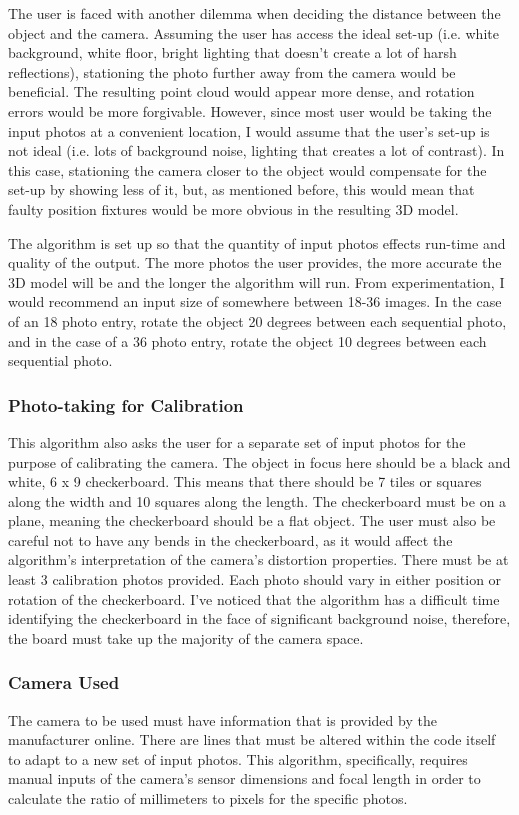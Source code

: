 \documentclass[10pt,twocolumn]{article}
\begin{document}
The user is faced with another dilemma when deciding the distance between the object and the camera. Assuming the user has access the ideal set-up (i.e. white background, white floor, bright lighting that doesn't create a lot of harsh reflections), stationing the photo further away from the camera would be beneficial. The resulting point cloud would appear more dense, and rotation errors would be more forgivable. However, since most user would be taking the input photos at a convenient location, I would assume that the user's set-up is not ideal (i.e. lots of background noise, lighting that creates a lot of contrast). In this case, stationing the camera closer to the object would compensate for the set-up by showing less of it, but, as mentioned before, this would mean that faulty position fixtures would be more obvious in the resulting 3D model. 

The algorithm is set up so that the quantity of input photos effects run-time and quality of the output. The more photos the user provides, the more accurate the 3D model will be and the longer the algorithm will run. From experimentation, I would recommend an input size of somewhere between 18-36 images. In the case of an 18 photo entry, rotate the object 20 degrees between each sequential photo, and in the case of a 36 photo entry, rotate the object 10 degrees between each sequential photo. 


\subsubsection{Photo-taking for Calibration}
This algorithm also asks the user for a separate set of input photos for the purpose of calibrating the camera. The object in focus here should be a black and white, 6 x 9 checkerboard. This means that there should be 7 tiles or squares along the width and 10 squares along the length. The checkerboard must be on a plane, meaning the checkerboard should be a flat object. The user must also be careful not to have any bends in the checkerboard, as it would affect the algorithm's interpretation of the camera's distortion properties. 
There must be at least 3 calibration photos provided. Each photo should vary in either position or rotation of the checkerboard. I've noticed that the algorithm has a difficult time identifying the checkerboard in the face of significant background noise, therefore, the board must take up the majority of the camera space.  

\subsubsection{Camera Used}
The camera to be used must have information that is provided by the manufacturer online. There are lines that must be altered within the code itself to adapt to a new set of input photos. This algorithm, specifically, requires manual inputs of the camera's sensor dimensions and focal length in order to calculate the ratio of millimeters to pixels for the specific photos.
\end{document}
